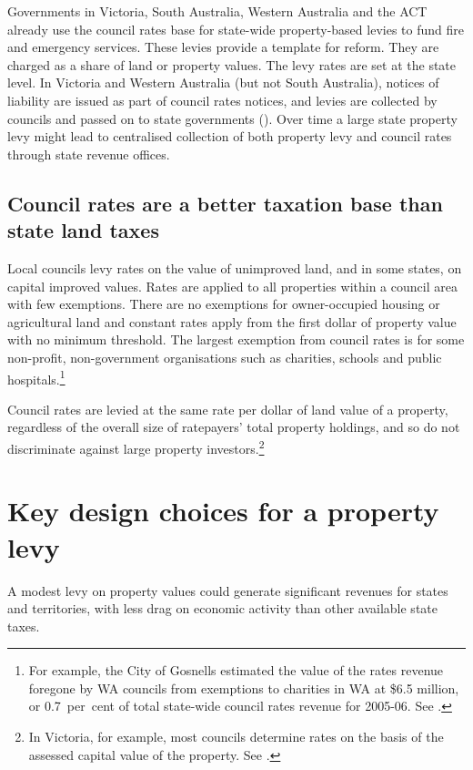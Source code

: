 \documentclass[twoside,english]{Dianab5ona4portrait}
\begin{document}
Governments in Victoria, South Australia, Western Australia and the ACT already use the council rates base for state-wide property-based levies to fund fire and emergency services. These levies provide a template for reform. They are charged as a share of land or property values. The levy rates are set at the state level. In Victoria and Western Australia (but not South Australia), notices of liability are issued as part of council rates notices, and levies are collected by councils and passed on to state governments (). Over time a large state property levy might lead to centralised collection of both property levy and council rates through state revenue offices.

\section{\label{sec:PROP-5-2}Council rates are a better taxation base than state land taxes}
Local councils levy rates on the value of unimproved land, and in some states, on capital improved values. Rates are applied to all properties within a council area with few exemptions. There are no exemptions for owner-occupied housing or agricultural land and constant rates apply from the first dollar of property value with no minimum threshold. The largest exemption from council rates is for some non-profit, non-government organisations such as charities, schools and public hospitals.\footnote{For example, the City of Gosnells estimated the value of the rates revenue foregone by WA councils from exemptions to charities in WA at \$6.5 million, or 0.7~per~cent of total state-wide council rates revenue for 2005-06. See \textcite[][107]{productivity2008assessing}.}

Council rates are levied at the same rate per dollar of land value of a property, regardless of the overall size of ratepayers’ total property holdings, and so do not discriminate against large property investors.\footnote{In Victoria, for example, most councils determine rates on the basis of the assessed capital value of the property. See \textcite[][154]{HefferanBoyd2010}.}  

\chapter{Key design choices for a property levy}
A modest levy on property values could generate significant revenues for states and territories, with less drag on economic activity than other available state taxes.
\end{document}
